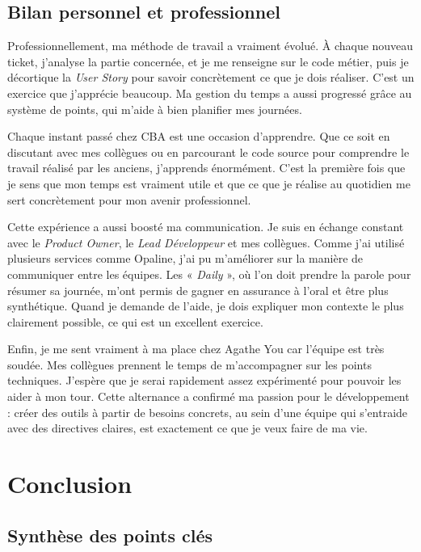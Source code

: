 \documentclass{article}
\begin{document}
\subsection{Bilan personnel et professionnel}

Professionnellement, ma méthode de travail a vraiment évolué. À chaque nouveau ticket, j'analyse la partie concernée, et je me renseigne sur le code métier, puis je décortique la \textit{User Story} pour savoir concrètement ce que je dois réaliser. C'est un exercice que j'apprécie beaucoup. Ma gestion du temps a aussi progressé grâce au système de points, qui m'aide à bien planifier mes journées.

Chaque instant passé chez CBA est une occasion d'apprendre. Que ce soit en discutant avec mes collègues ou en parcourant le code source pour comprendre le travail réalisé par les anciens, j'apprends énormément. C'est la première fois que je sens que mon temps est vraiment utile et que ce que je réalise au quotidien me sert concrètement pour mon avenir professionnel.

\newpage

Cette expérience a aussi boosté ma communication. Je suis en échange constant avec le \textit{Product Owner}, le \textit{Lead Développeur} et mes collègues. Comme j'ai utilisé plusieurs services comme Opaline, j'ai pu m'améliorer sur la manière de communiquer entre les équipes. Les « \textit{Daily} », où l'on doit prendre la parole pour résumer sa journée, m'ont permis de gagner en assurance à l'oral et être plus synthétique. Quand je demande de l'aide, je dois expliquer mon contexte le plus clairement possible, ce qui est un excellent exercice.

Enfin, je me sent vraiment à ma place chez Agathe You car l'équipe est très soudée. Mes collègues prennent le temps de m'accompagner sur les points techniques. J'espère que je serai rapidement assez expérimenté pour pouvoir les aider à mon tour. Cette alternance a confirmé ma passion pour le développement : créer des outils à partir de besoins concrets, au sein d'une équipe qui s'entraide avec des directives claires, est exactement ce que je veux faire de ma vie.

\section{Conclusion}

\subsection{Synthèse des points clés}
\end{document}
